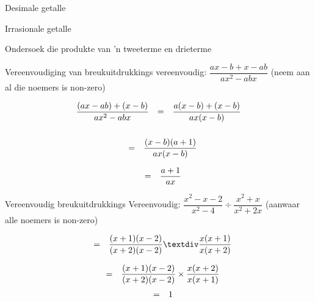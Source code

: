 \begin{Aktiwiteit}{Desimale getalle}
\begin{aktiwiteit}{Irrasionale getalle}
\begin{aktiwiteit}{Ondersoek die produkte van 'n tweeterme en drieterme}
\begin{wex}{ Vereenvoudiging van breukuitdrukkings }{vereenvoudig: $\dfrac{ax-b+x-ab}{a{x}^{2}-abx}$ (neem aan al die noemers is non-zero)}
{\par 


\begin{equation*}
\begin{array}{lll}\dfrac{(ax-ab)+(x-b)}{a{x}^{2}-abx}\hfill & =& \dfrac{a(x-b)+(x-b)}{ax(x-b)}\hfill \\ \end{array}
\end{equation*}
\begin{equation*}
\begin{array}{lll}
\\& =& \dfrac{(x-b)(a+1)}{ax(x-b)}\hfill \end{array}
\end{equation*}

\begin{equation*}
\begin{array}{ccc}& =& \dfrac{a+1}{ax}\hfill \end{array}
\end{equation*}
}
\end{wex}


\begin{wex}{Vereenvoudig breukuitdrukkings }
{Vereenvoudig: $\dfrac{{x}^{2}-x-2}{{x}^{2}-4}÷\dfrac{{x}^{2}+x}{{x}^{2}+2x}$  (aanwaar alle noemers is non-zero)} {
\begin{equation*}
\begin{array}{ccc}& =& \dfrac{(x+1)(x-2)}{(x+2)(x-2)}÷\dfrac{x(x+1)}{x(x+2)}\hfill \end{array}
\end{equation*}


\begin{equation*}
\begin{array}{ccc}& =& \dfrac{(x+1)(x-2)}{(x+2)(x-2)}\ensuremath{\times}\dfrac{x(x+2)}{x(x+1)}\hfill \end{array}
\end{equation*}
\begin{equation*}
\begin{array}{ccc}& =& 1\hfill \end{array}
\end{equation*}
}
\end{wex}



\end{aktiwiteit}
\end{aktiwiteit}
\end{Aktiwiteit}
